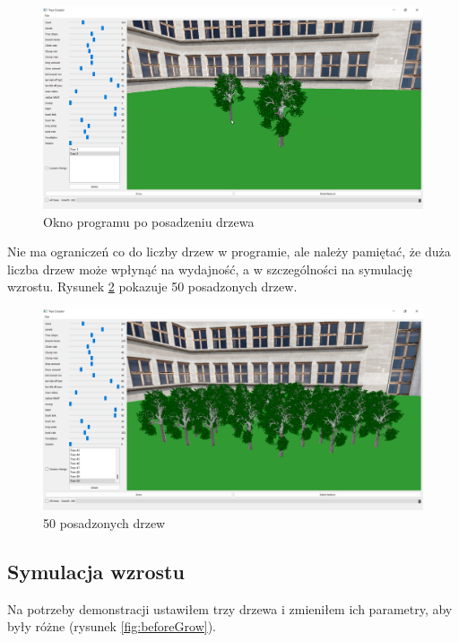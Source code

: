 \documentclass[a4paper,twoside,12pt]{report}
\begin{document}
\begin{figure}[H]
	\centering\includegraphics[width=15.5cm]{grafika/program/placeTree2.png}
	\caption{Okno programu po posadzeniu drzewa}
    \label{fig:placeTree2}
\end{figure}

Nie ma ograniczeń co do liczby drzew w programie, 
ale należy pamiętać, że duża liczba drzew może wpłynąć na wydajność, 
a w szczególności na symulację wzrostu. Rysunek \ref{fig:50trees} pokazuje 
50 posadzonych drzew.

\begin{figure}[H]
	\centering\includegraphics[width=15.5cm]{grafika/program/50trees.png}
	\caption{50 posadzonych drzew}
    \label{fig:50trees}
\end{figure}

\subsection{Symulacja wzrostu}

Na potrzeby demonstracji ustawiłem trzy drzewa i 
zmieniłem ich parametry, aby były różne (rysunek \ref{fig:beforeGrow}).
\end{document}
